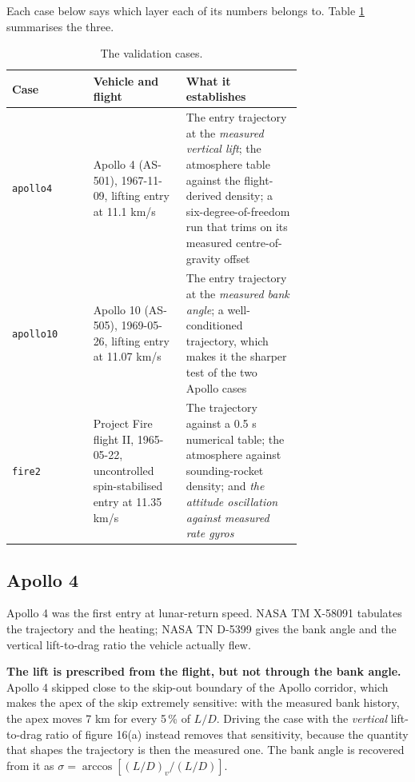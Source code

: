 \documentclass[11pt,a4paper]{article}
\begin{document}
Each case below says which layer each of its numbers belongs to. Table \ref{validation_cases}
summarises the three.

\begin{table}[h]
\caption{The validation cases.}
\label{validation_cases}
\begin{center}
\begin{tabular}{l|p{0.32\linewidth}|p{0.40\linewidth}}
\hline \hline
Case & Vehicle and flight & What it establishes \\
\hline
\texttt{apollo4} & Apollo 4 (AS-501), 1967-11-09, lifting entry at 11.1 km/s &
The entry trajectory at the \emph{measured vertical lift}; the atmosphere table against
the flight-derived density; a six-degree-of-freedom run that trims on its measured
centre-of-gravity offset \\
\texttt{apollo10} & Apollo 10 (AS-505), 1969-05-26, lifting entry at 11.07 km/s &
The entry trajectory at the \emph{measured bank angle}; a well-conditioned trajectory,
which makes it the sharper test of the two Apollo cases \\
\texttt{fire2} & Project Fire flight II, 1965-05-22, uncontrolled spin-stabilised entry at
11.35 km/s &
The trajectory against a 0.5 s numerical table; the atmosphere against sounding-rocket
density; and \emph{the attitude oscillation against measured rate gyros} \\
\hline \hline
\end{tabular}
\end{center}
\end{table}

\subsection{Apollo 4}

Apollo 4 was the first entry at lunar-return speed. NASA TM X-58091 \cite{Ried1972}
tabulates the trajectory and the heating; NASA TN D-5399 \cite{Hillje1969} gives the bank
angle and the vertical lift-to-drag ratio the vehicle actually flew.

\textbf{The lift is prescribed from the flight, but not through the bank angle.} Apollo 4
skipped close to the skip-out boundary of the Apollo corridor, which makes the apex of the
skip extremely sensitive: with the measured bank history, the apex moves 7 km for every
5\,\% of $L/D$. Driving the case with the \emph{vertical} lift-to-drag ratio of
figure 16(a) instead removes that sensitivity, because the quantity that shapes the
trajectory is then the measured one. The bank angle is recovered from it as
$\sigma = \arccos\left[ (L/D)_v / (L/D) \right]$.
\end{document}
